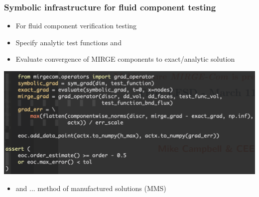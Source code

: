 \begin{frame}\frametitle{Symbolic infrastructure for fluid component testing}
\begin{itemize}
\item For fluid component verification testing
\item Specify analytic test functions and 
\item Evaluate convergence of MIRGE components to exact/analytic solution
\end{itemize}
\includegraphics[width=\textwidth]{figures/ComponentVerifCode.png}
\begin{itemize}
\vspace{-10pt}
\item and ... method of manufactured solutions (MMS)
\end{itemize}
\end{frame}

